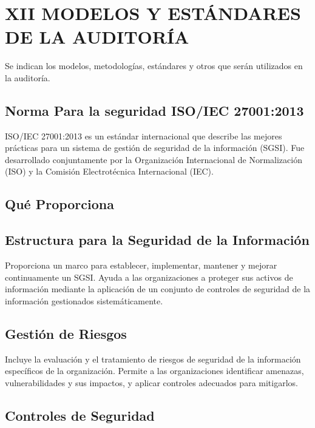 \documentclass[12pt,a4paper]{article}
\begin{document}
\section{XII MODELOS Y ESTÁNDARES DE LA AUDITORÍA}
Se indican los modelos, metodologías, estándares y otros que serán utilizados en la auditoría.
\subsection{Norma Para la seguridad ISO/IEC 27001:2013}
ISO/IEC 27001:2013 es un estándar internacional que describe las mejores prácticas para un sistema de gestión de seguridad de la información (SGSI). Fue desarrollado conjuntamente por la Organización Internacional de Normalización (ISO) y la Comisión Electrotécnica Internacional (IEC).
\subsection*{Qué Proporciona}
\subsection*{Estructura para la Seguridad de la Información}
Proporciona un marco para establecer, implementar, mantener y mejorar continuamente un SGSI.
Ayuda a las organizaciones a proteger sus activos de información mediante la aplicación de un conjunto de controles de seguridad de la información gestionados sistemáticamente.
\subsection*{Gestión de Riesgos}

Incluye la evaluación y el tratamiento de riesgos de seguridad de la información específicos de la organización.
Permite a las organizaciones identificar amenazas, vulnerabilidades y sus impactos, y aplicar controles adecuados para mitigarlos.
\subsection*{Controles de Seguridad}
\end{document}
